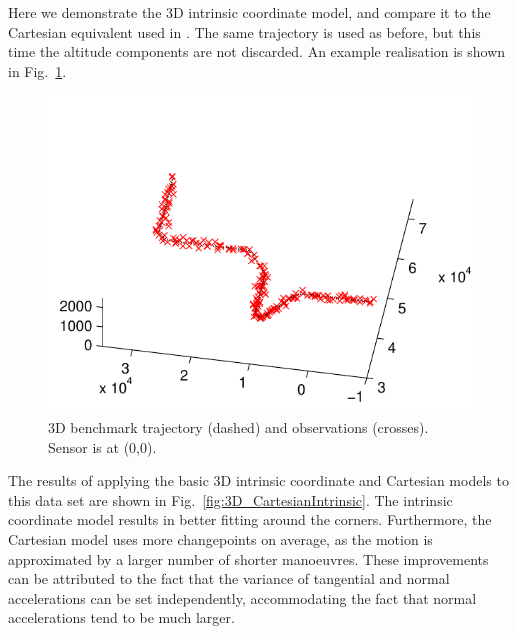 \documentclass[conference]{IEEEtran}
\begin{document}
Here we demonstrate the 3D intrinsic coordinate model, and compare it to the Cartesian equivalent used in \cite{Whiteley2007a,Whiteley2011}. The same trajectory is used as before, but this time the altitude components are not discarded. An example realisation is shown in Fig.~\ref{fig:3D_ground_truth}.
%
\begin{figure}
\centering
\includegraphics[width=0.95\columnwidth]{images/3Dbenchmark_problem.pdf}
\caption{3D benchmark trajectory (dashed) and observations (crosses). Sensor is at (0,0).}
\label{fig:3D_ground_truth}
\end{figure}
%
The results of applying the basic 3D intrinsic coordinate and Cartesian models to this data set are shown in Fig.~\ref{fig:3D_CartesianIntrinsic}. The intrinsic coordinate model results in better fitting around the corners. Furthermore, the Cartesian model uses more changepoints on average, as the motion is approximated by a larger number of shorter manoeuvres. These improvements can be attributed to the fact that the variance of tangential and normal accelerations can be set independently, accommodating the fact that normal accelerations tend to be much larger.
%
\end{document}
